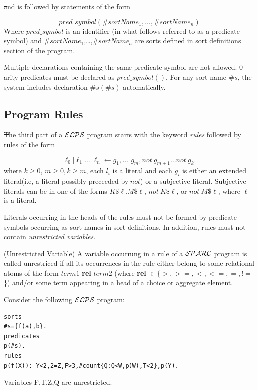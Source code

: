 \documentclass[12pt, letterpaper]{article}
\begin{document}
\st and is followed by statements of the form

\begin{equation*}
pred\_symbol(\#sortName_1,\dots,\#sortName_n)
\end{equation*}
\st

Where $pred\_symbol$ is an identifier (in what follows referred to as a predicate symbol) and  $\#sortName_1$,\dots,$\#sortName_n$ are sorts defined in sort definitions section of the program.



Multiple declarations containing the same predicate symbol are not allowed.
0-arity predicates must be declared as $pred\_symbol()$.
\st For any sort name $\#s$, the system includes declaration  $\#s(\#s)$ automatically. 

\subsection{Program Rules}


\st The third part of a ${\cal ELPS}$ program starts with the keyword \textit{rules} followed by  rules of the form

\begin{equation}
   \ell_0 | \ell_1 \dots |\ell_n \gets  g_1, \ldots, g_m, not~g_{m+1} \ldots not~g_{k}.
\end{equation}
where  $k\ge 0$, $m \ge 0, k\ge  m$,
each $l_i$ is a literal and each $g_i$ is  either an extended literal(i.e, a literal possibly preceeded by $not$) or a subjective literal. Subjective literals can be in one of the forms $K\$\ell$,$M\$\ell$, $not~ K\$\ell$, or $not~M\$\ell$, where $\ell$ is a literal.
 
Literals occurring in the heads of the rules must not be formed by predicate symbols
occurring as sort names in sort definitions. In addition, rules must not contain \textit{unrestricted variables}.

\begin{definition}(Unrestricted Variable)
 A variable occurrung in a rule of a ${\cal SPARC}$ program is called unrestriced if all its occurrences in the rule either belong to some relational atoms of the form 
$term1$ \textbf{rel} $term2$ (where \textbf{rel} $\in  \{>,>=,<,<=,=,!=$\})  and/or  some term appearing in a head of a choice or aggregate element. 
\end{definition}
\begin{example}
\em{
 Consider the following ${\cal ELPS}$ program:
\begin{verbatim}
sorts
#s={f(a),b}.
predicates
p(#s).
rules
p(f(X)):-Y<2,2=Z,F>3,#count{Q:Q<W,p(W),T<2},p(Y).
\end{verbatim}
Variables F,T,Z,Q are unrestricted.
}  
\end{example}
\end{document}
